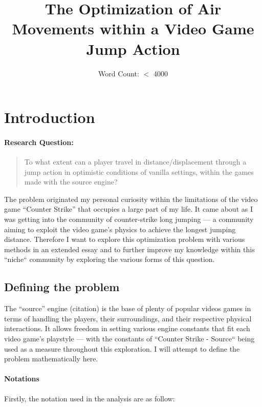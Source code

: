 \documentclass[a4paper,11pt]{article}
\title{The Optimization of Air Movements within a Video Game Jump Action}
\author{Word Count: $<$ 4000}
\date{}
\begin{document}
    \maketitle

    \newpage

    \tableofcontents

    \newpage

\section{Introduction}

\paragraph{Research Question:}
\begin{quote}
    To what extent can a player travel in distance/displacement through a jump action in optimistic conditions of vanilla settings, within the games made with the source engine?
\end{quote}

The problem originated my personal curiosity within the limitations of the video game ``Counter Strike'' that occupies a large part of my life. It came about as I was getting into the community of counter-strike long jumping --- a community aiming to exploit the video game's physics to achieve the longest jumping distance. Therefore I want to explore this optimization problem with various methods in an extended essay and to further improve my knowledge within this ``niche`` community by exploring the various forms of this question.

\subsection{Defining the problem}
The ``source'' engine (citation) is the base of plenty of popular videos games in terms of handling the players, their surroundings, and their respective physical interactions. It allows freedom in setting various engine constants that fit each video game's playstyle --- with the constants of ``Counter Strike - Source`` being used as a measure throughout this exploration. I will attempt to define the problem mathematically here.

\paragraph{Notations} Firstly, the notation used in the analysis are as follow:
\end{document}
